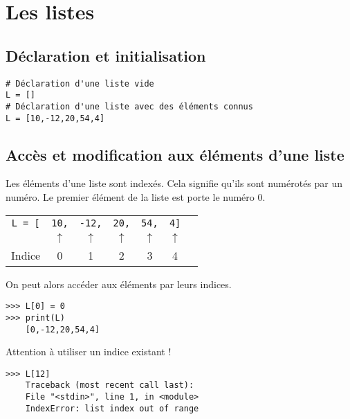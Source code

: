 \section{Les listes}

\subsection{Déclaration et initialisation}
\begin{lstlisting}
# Déclaration d'une liste vide
L = []
# Déclaration d'une liste avec des éléments connus
L = [10,-12,20,54,4]
\end{lstlisting}

\subsection{Accès et modification aux éléments d'une liste}

Les éléments d'une liste sont indexés. Cela signifie qu'ils sont numérotés par un numéro. Le premier élément de la liste est porte le numéro 0.
\begin{center}
\begin{tabular}{ccccccc}
\texttt{L = [} & \texttt{10,} & \texttt{-12,} & \texttt{20,} & \texttt{54,} & \texttt{4]} \\
& $\uparrow$& $\uparrow$& $\uparrow$& $\uparrow$& $\uparrow$\\

Indice & 0& 1& 2 & 3 & 4 \\
\end{tabular}
\end{center}



On peut alors accéder aux éléments par leurs indices. 

\begin{lstlisting}
>>> L[0] = 0
>>> print(L)
    [0,-12,20,54,4]
\end{lstlisting}


Attention à utiliser un indice existant !
\begin{lstlisting}
>>> L[12]
    Traceback (most recent call last):
    File "<stdin>", line 1, in <module>
    IndexError: list index out of range
\end{lstlisting}

